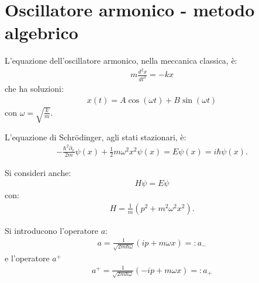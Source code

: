 \section{Oscillatore armonico - metodo algebrico} %
L'equazione dell'oscillatore armonico, nella meccanica classica, è:
\begin{equation}\begin{split}
m\frac{d^2x}{dt^2}=-kx
\end{split}\end{equation}
che ha soluzioni:
\begin{equation}\begin{split}
x\left(t\right)=A\cos{\left(\omega t\right)}+B\sin{\left(\omega t\right)}
\end{split}\end{equation}
 con $\omega=\sqrt{\frac{k}{m}}$.

L'equazione di Schrödinger, agli stati stazionari, è:
\begin{equation}\begin{split}
-\frac{\hbar ^2\partial _x}{2m}\psi \left(x\right)+\frac{1}{2}m\omega ^2x^2\psi \left(x\right)=E\psi \left(x\right)=i\hbar \psi \left(x\right).
\end{split}\end{equation}

Si consideri anche:
\begin{equation}\begin{split}
H\psi =E\psi 
\end{split}\end{equation}
con:
\begin{equation}\begin{split}
H=\frac{1}{m}\left(p^2+m^2\omega ^2x^2\right).
\end{split}\end{equation}

Si introducono l'operatore $a$:
\begin{equation}\begin{split}
a=\frac{1}{\sqrt{2m\hbar \omega }}\left(ip+m\omega x\right)=:a_-
\end{split}\end{equation}
e l'operatore $a^+$
\begin{equation}\begin{split}
a^+=\frac{1}{\sqrt{2m\hbar \omega }}\left(-ip+m\omega x\right)=:a_+
\end{split}\end{equation}

